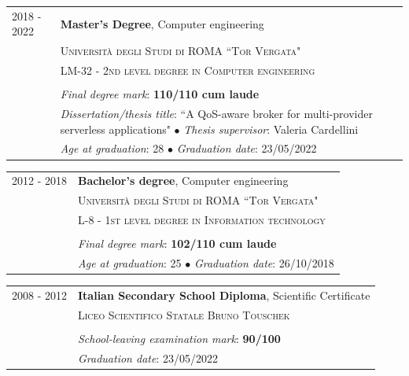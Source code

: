 \documentclass[english,10pt,a4paper]{article}
\newcommand{\CvEducation}[2]{ {\small \textit{#1}: #2}}
\newcommand{\CvBullet}{\hspace{0.05cm} $\bullet$ \hspace{0.05cm}}
\newcommand{\CvTimeRange}[2]{\textcolor{CvColor}{\textsc{#1 - #2}}}
\def\SidebarHSize{3.5cm}
\def\BodyHSize{11cm}
\begin{document}
	\begin{longtable}{p{\SidebarHSize}|p{\BodyHSize}}
		\CvTimeRange{2018}{2022} & \textbf{Master’s Degree}, Computer engineering \\
		& \textsc{Università degli Studi di ROMA ``Tor Vergata"} \\
		& \textsc{LM-32 - 2nd level degree in Computer engineering}\\
		& \\
		& \CvEducation{Final degree mark}{\textbf{110/110 cum laude}} \\
		& \CvEducation{Dissertation/thesis title}{``A QoS-aware broker for multi-provider serverless applications"} \CvBullet \CvEducation{Thesis supervisor}{Valeria Cardellini} \\
		& \CvEducation{Age at graduation}{28} \CvBullet \CvEducation{Graduation date}{23/05/2022}	
	\end{longtable}
	
	\begin{longtable}{p{\SidebarHSize}|p{\BodyHSize}}
		\CvTimeRange{2012}{2018} & \textbf{Bachelor's degree}, Computer engineering \\
		& \textsc{Università degli Studi di ROMA ``Tor Vergata"} \\
		& \textsc{L-8 - 1st level degree in Information technology}\\
		& \\
		& \CvEducation{Final degree mark}{\textbf{102/110 cum laude}} \\	
		& \CvEducation{Age at graduation}{25} \CvBullet \CvEducation{Graduation date}{26/10/2018}	
	\end{longtable}
		
	\begin{longtable}{p{\SidebarHSize}|p{\BodyHSize}}
		\CvTimeRange{2008}{2012} & \textbf{Italian Secondary School Diploma}, Scientific Certificate \\
		& \textsc{Liceo Scientifico Statale Bruno Touschek} \\	
		& \\
		& \CvEducation{School-leaving examination mark}{\textbf{90/100}} \\
		& \CvEducation{Graduation date}{23/05/2022}	
	\end{longtable}
\end{document}
